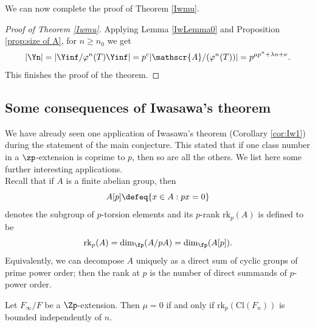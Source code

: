 \documentclass[a4paper,10pt, english, reqno]{smfart}
\numberwithin{equation}{section}
\begin{document}
We can now complete the proof of Theorem \ref{Iwmu}.

\begin{proof} [Proof of Theorem \ref{Iwmu}]
Applying Lemma \ref{IwLemma0} and Proposition \ref{prop:size of A}, for $n \geq n_0$ we get
\[ | \Yn | = | \Yinf / \varphi^n(T)  \Yinf| = p^{c} | \mathscr{A} / (\varphi^n(T)) | = p^{\mu p^n + \lambda n + \nu}. \] This finishes the proof of the theorem.
\end{proof}

\subsection{Some consequences of Iwasawa's theorem}

We have already seen one application of Iwasawa's theorem (Corollary \ref{cor:Iw1}) during the statement of the main conjecture. This stated that if one class number in a $\zp$-extension is coprime to $p$, then so are all the others. We list here some further interesting applications.\\

Recall that if $A$ is a finite abelian group, then 
\[A[p] \defeq \{ x \in A :  p x = 0 \}\]
 denotes the subgroup of $p$-torsion elements and its $p$-rank $\mathrm{rk}_p(A)$ is defined to be 
\[\mathrm{rk}_p(A) = \dim_{\fp}(A / pA) = \mathrm{dim}_{\fp}(A[p]).\]
Equivalently, we can decompose $A$ uniquely as a direct sum of cyclic groups of prime power order; then the rank at $p$ is the number of direct summands of $p$-power order. 

\begin{corollary} \label{mu0prankbounded}
Let $F_\infty/F$ be a $\Zp$-extension. Then $\mu = 0$ if and only if $\mathrm{rk}_p(\mathrm{Cl}(F_n))$ is bounded independently of $n$.
\end{corollary}
\end{document}
